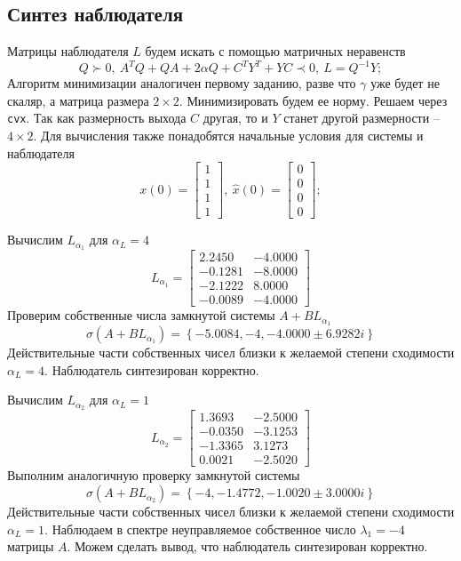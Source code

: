 \documentclass[a4paper, 12pt]{article}
\begin{document}
    \subsection{Синтез наблюдателя}
    Матрицы наблюдателя $L$ будем искать с помощью матричных неравенств
    $$
    Q\succ0,\ A^TQ+QA+2\alpha Q+C^TY^T+YC\prec 0,\ L=Q^{-1}Y;
    $$
    Алгоритм минимизации аналогичен первому заданию, разве что $\gamma$ уже будет не скаляр,
    а матрица размера $2\times2$. Минимизировать будем ее норму. Решаем через \texttt{cvx}.
    Так как размерность выхода $C$ другая, то и $Y$ станет другой размерности -- $4\times2$.
    Для вычисления также понадобятся начальные условия для системы и наблюдателя
    $$
    x(0)=\begin{bmatrix}
        1\\1\\1\\1
    \end{bmatrix},\ \hat{x}(0)=\begin{bmatrix}
        0\\0\\0\\0
    \end{bmatrix};
    $$


    Вычислим $L_{\alpha_1}$ для $\alpha_L=4$
    $$
    L_{\alpha_1}=\begin{bmatrix}
        2.2450   &-4.0000\\
        -0.1281   &-8.0000\\
        -2.1222    &8.0000\\
        -0.0089   &-4.0000
    \end{bmatrix}
    $$
    Проверим собственные числа замкнутой системы $A+BL_{\alpha_1}$
    $$
    \sigma\left( A+BL_{\alpha_1} \right)=\left\{ -5.0084, -4, -4.0000 \pm 6.9282i \right\}
    $$
    Действительные части собственных чисел близки к желаемой степени сходимости $\alpha_L=4$. Наблюдатель синтезирован корректно.


    Вычислим $L_{\alpha_2}$ для $\alpha_L=1$
    $$
    L_{\alpha_2}=\begin{bmatrix}
        1.3693   &-2.5000\\
   -0.0350   &-3.1253\\
   -1.3365    &3.1273\\
    0.0021   &-2.5020
    \end{bmatrix}
    $$
    Выполним аналогичную проверку замкнутой системы
    $$
    \sigma\left( A+BL_{\alpha_2} \right)=\left\{ -4, -1.4772, -1.0020 \pm 3.0000i \right\}
    $$
    Действительные части собственных чисел близки к желаемой степени сходимости $\alpha_L=1$.
    Наблюдаем в спектре неуправляемое собственное число $\lambda_1=-4$ матрицы $A$.
    Можем сделать вывод, что наблюдатель синтезирован корректно.
\end{document}
